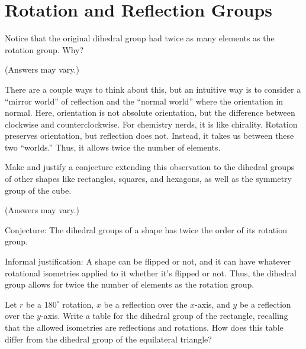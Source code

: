 \documentclass[../key.tex]{subfiles}
\begin{document}
\section{Rotation and Reflection Groups}

\begin{outer_problem}[start=1]
\item Notice that the original dihedral group had twice as many elements as the rotation group. Why?
\end{outer_problem}

\noindent(Answers may vary.)

There are a couple ways to think about this, but an intuitive way is to consider a ``mirror world'' of reflection and the ``normal world'' where the orientation in normal. Here, orientation is not absolute orientation, but the difference between clockwise and counterclockwise. For chemistry nerds, it is like chirality. Rotation preserves orientation, but reflection does not. Instead, it takes us between these two ``worlds.'' Thus, it allows twice the number of elements.

\begin{outer_problem}
\item Make and justify a conjecture extending this observation to the dihedral groups of other shapes like rectangles, squares, and hexagons, as well as the symmetry group of the cube.
\end{outer_problem}

\noindent(Answers may vary.)

Conjecture: The dihedral groups of a shape has twice the order of its rotation group.

Informal justification: A shape can be flipped or not, and it can have whatever rotational isometries applied to it whether it's flipped or not. Thus, the dihedral group allows for twice the number of elements as the rotation group.

\begin{outer_problem}
\item Let $r$ be a $180^{\circ}$ rotation, $x$ be a reflection over the $x$-axis, and $y$ be a reflection over the $y$-axis. Write a table for the dihedral group of the rectangle, recalling that the allowed isometries are reflections and rotations. How does this table differ from the dihedral group of the equilateral triangle? \label{prob:rectangle_group}
\end{outer_problem}
\end{document}

